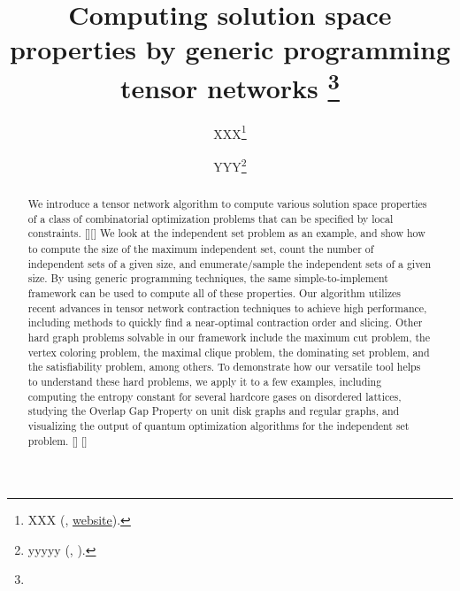 \documentclass[onefignum, onetabnum]{siamart190516}
\title{Computing solution space properties by generic programming tensor networks
\thanks{\funding{...}}
}
\author{XXX\thanks{XXX 
  (\email{email}, \url{website}).}
\and YYY\thanks{yyyyy 
  (\email{yyyy}, \email{email}).}
}
\newcommand{\<}{\langle}
\renewcommand{\>}{\rangle}
\newcommand{\blue}[1]{[{\bf  \color{blue}{JG: #1}}]}
\newcommand{\purple}[1]{[{\bf  \color{purple}{MC: #1}}]}
\newcounter{example}
\begin{document}
\maketitle

\begin{abstract}
We introduce a tensor network algorithm %
to compute various solution space properties of a class of combinatorial optimization problems that can be specified by local constraints. \purple{I still think there is a more concise way to word the class of combinatorial optimization problems this works on...}\blue{changed a bit, better?}
We look at the independent set problem as an example, and show how to compute the size of the maximum independent set, count the number of independent sets of a given size, and enumerate/sample the independent sets of a given size.
By using generic programming techniques, %
the same simple-to-implement framework can be used to compute all of these properties. Our algorithm utilizes recent advances in tensor network contraction techniques to achieve high performance, including methods to quickly find a near-optimal contraction order and slicing.
Other hard graph problems solvable in our framework include the maximum cut problem, the vertex coloring problem, the maximal clique problem, the dominating set problem, and the satisfiability problem, among others.
To demonstrate how our versatile tool helps to understand these hard problems, we apply it to a few examples, including computing the entropy constant for several hardcore gases on disordered lattices, studying the Overlap Gap Property on unit disk graphs and regular graphs, and visualizing the output of quantum optimization algorithms for the independent set problem. \purple{I might not directly mention the classes of graphs we look at for Overlap Gap - it might be too much information. I'm not sure though, what do you think?} \blue{I agree ``King's graphs at 0.8 filling and 3-regular graphs'' is a bit too detailed, so I rephrased it as ``unit disk graphs and regular graphs'' that only conveys the most important information.} %

\end{abstract}
\end{document}
